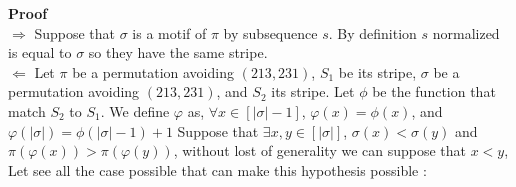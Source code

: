 \documentclass[a4paper]{llncs}
\newcommand{\ptext}{\pi}
\newcommand{\pmotif}{\sigma}
\begin{document}
		
		\textbf{Proof} \\
		$\Rightarrow$ Suppose that $\pmotif$ is a motif of $\ptext$
		by subsequence $s$.
		By definition $s$ normalized is equal to
		$\pmotif$ so they have the same stripe.\\ 
		$\Leftarrow$ 
		Let $\ptext$ be a permutation avoiding $(213,231)$, 
		$S_1$ be its stripe, 
		$\pmotif$  be a permutation avoiding $(213,231)$, 
		and $S_2$ its stripe.
		Let $\phi$ be the function
		that match $S_2$ to $S_1$.
		We define $\varphi$ as, 
		$\forall x \in [|\pmotif|-1]$,
		$\varphi(x) = \phi(x)$,
		and $\varphi(|\pmotif|) = \phi(|\pmotif|-1)+1$
		Suppose that $\exists x,y \in [|\pmotif|]$, 
		$\pmotif(x)<\pmotif(y)$ 
		and $\ptext(\varphi(x))>\ptext(\varphi(y))$,
		without lost of generality we can suppose that $x<y$,
		Let see all the case possible that can make this 
		hypothesis possible :
\end{document}
